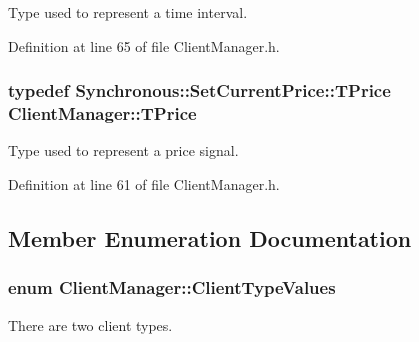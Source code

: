 Type used to represent a time interval. 



Definition at line 65 of file Client\-Manager.\-h.

\hypertarget{class_client_manager_ae957a71b432eb6d9d39b0f397cd89874}{
\subsubsection[{T\-Price}]{\setlength{\rightskip}{0pt plus 5cm}typedef {\bf Synchronous\-::\-Set\-Current\-Price\-::\-T\-Price} {\bf Client\-Manager\-::\-T\-Price}}}\label{class_client_manager_ae957a71b432eb6d9d39b0f397cd89874}


Type used to represent a price signal. 



Definition at line 61 of file Client\-Manager.\-h.



\subsection{Member Enumeration Documentation}
\hypertarget{class_client_manager_ac12239be9a30847f677a32910822d40b}{
\subsubsection[{Client\-Type\-Values}]{\setlength{\rightskip}{0pt plus 5cm}enum {\bf Client\-Manager\-::\-Client\-Type\-Values}\hspace{0.3cm}{\ttfamily [private]}}}\label{class_client_manager_ac12239be9a30847f677a32910822d40b}


There are two client types. 


